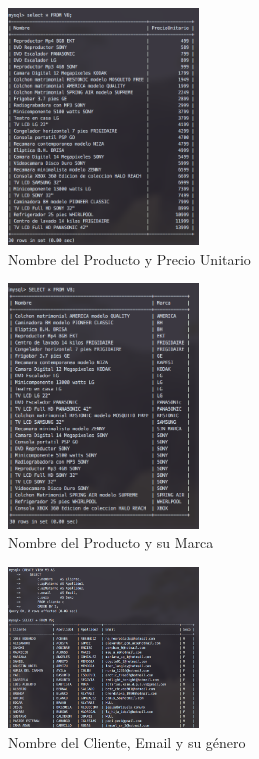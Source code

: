 \documentclass[12pt, fleqn]{article}                             %
\begin{document}
        \begin{figure}[ht!]
            \centering
            \includegraphics[width=0.45\textwidth]{BD5Reporte8}
            \caption{Nombre del Producto y Precio Unitario}
        \end{figure}

        \begin{figure}[ht!]
            \centering
            \includegraphics[width=0.45\textwidth]{BD5Reporte9}
            \caption{Nombre del Producto y su Marca}
        \end{figure}

        \begin{figure}[ht!]
            \centering
            \includegraphics[width=0.45\textwidth]{BD5Reporte10}
            \caption{Nombre del Cliente, Email y su género}
        \end{figure}
\end{document}
